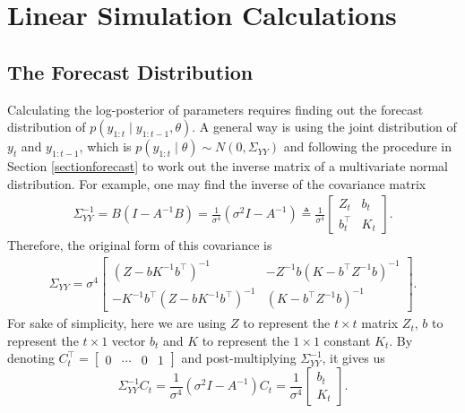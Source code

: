 \setcounter{figure}{1} 

\section{Linear Simulation Calculations}\label{linearcalculation}

\subsection*{The Forecast Distribution} 

Calculating the log-posterior of parameters requires finding out the forecast distribution of $p\left(y_{1:t}\mid y_{1:t-1},\theta\right)$. A general way is using the joint distribution of $y_{t}$ and $y_{1:t-1}$, which is $p\left(y_{1:t}\mid \theta\right)\sim N\left(0,\Sigma_{YY}\right)$ and following the procedure in Section \ref{sectionforecast} to work out the inverse matrix of a multivariate normal distribution. For example, one may find the inverse of the covariance matrix 
\begin{align*}
\Sigma_{YY}^{-1} = B\left(I-A^{-1}B\right) =\frac{1}{\sigma^4}\left(\sigma^2 I-A^{-1}\right) \triangleq \frac{1}{\sigma^4} \left[\begin{matrix} 
Z_{t} & b_{t} \\
b_{t}^\top & K_{t}
\end{matrix} \right].
\end{align*}
Therefore, the original form of this covariance is 
\begin{align*} \Sigma_{YY} =\sigma^4 \left[ \begin{matrix}
\left(Z-bK^{-1}b^\top\right)^{-1} & -Z^{-1}b\left(K-b^\top Z^{-1}b\right)^{-1}\\
-K^{-1}b^\top \left(Z-bK^{-1}b^\top\right)^{-1} & \left(K-b^\top Z^{-1}b\right)^{-1}
\end{matrix}\right].
\end{align*}
For sake of simplicity, here we are using $Z$ to represent the $t\times t$ matrix $Z_{t}$, $b$ to represent the $t \times 1$ vector  $b_{t}$  and $K$ to represent the $1\times 1$ constant $K_{t}$. By denoting $C_{t}^\top = \begin{bmatrix} 0 & \cdots & 0 & 1\end{bmatrix}$ and post-multiplying $\Sigma_{YY}^{-1}$, it gives us 
\begin{equation}
\Sigma_{YY}^{-1} C_{t}= \frac{1}{\sigma^4}\left(\sigma^2 I-A^{-1}\right) C_{t}= \frac{1}{\sigma^4} \left[\begin{matrix} b_{t} \\ K_{t} \end{matrix} \right].
\end{equation} 

